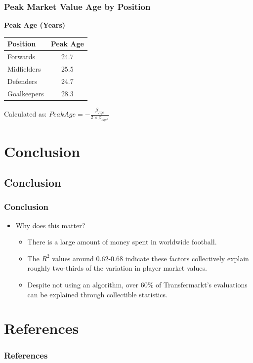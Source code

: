 \documentclass[t,aspectratio=169,xcolor=dvipsnames]{beamer}
\begin{document}
\begin{frame}
    \frametitle{Peak Market Value Age by Position} 
    
    \begin{center}
        \Large
        \textbf{Peak Age (Years)}
        
        \vspace{1cm}
        \begin{tabular}{lc}
            \hline
            \textbf{Position} & \textbf{Peak Age} \\
            \hline
            Forwards & 24.7 \\
            Midfielders & 25.5 \\
            Defenders & 24.7 \\
            Goalkeepers & 28.3 \\
            \hline
        \end{tabular}
        
        \normalsize
        Calculated as: $Peak Age = -\frac{\beta_{Age}}{2 \times \beta_{Age^2}}$
    \end{center}
\end{frame}
\section{Conclusion}
\subsection*{Conclusion}
\begin{frame}[shrink=15]
    \frametitle{Conclusion}
    
    \begin{itemize}\setlength{\itemsep}{0pt}
    
      \item Why does this matter?
      \begin{itemize}\setlength{\itemsep}{0pt}
        \item There is a large amount of money spent in worldwide football.        
        \item The $R^2$ values around 0.62-0.68 indicate these factors collectively explain roughly two-thirds of the variation in player market values.
        \item Despite not using an algorithm, over 60\% of Transfermarkt's evaluations can be explained through collectible statistics. 
        
      \end{itemize}
      \vspace{0.2cm}
    \end{itemize}
\end{frame}
\section{References}
\begin{frame}
\frametitle{References}


\end{frame}

\end{document}
